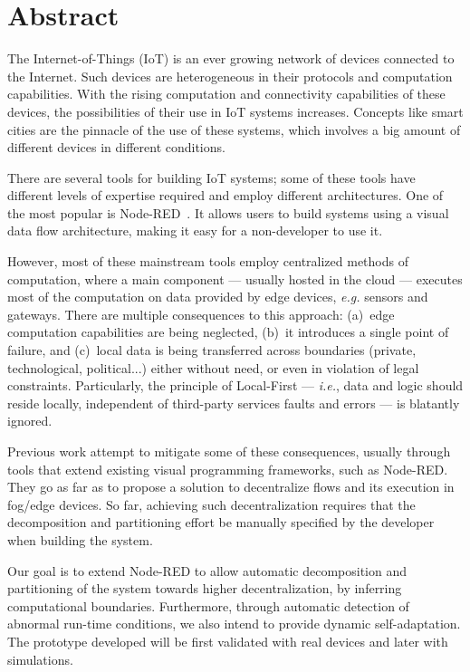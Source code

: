 \chapter*{Abstract}

The Internet-of-Things (IoT) is an ever growing network of devices connected to the Internet. Such devices are heterogeneous in their protocols and computation capabilities. With the rising computation and connectivity capabilities of these devices, the possibilities of their use in IoT systems increases. Concepts like smart cities are the pinnacle of the use of these systems, which involves a big amount of different devices in different conditions.

There are several tools for building IoT systems; some of these tools have different levels of expertise required and employ different architectures. One of the most popular is Node-RED~\cite{Node-red2017}. It allows users to build systems using a visual data flow architecture, making it easy for a non-developer to use it.

However, most of these mainstream tools employ centralized methods of computation, where a main component --- usually hosted in the cloud --- executes most of the computation on data provided by edge devices, \emph{e.g.} sensors and gateways. There are multiple consequences to this approach: (a)~edge computation capabilities are being neglected, (b)~it introduces a single point of failure, and (c)~local data is being transferred across boundaries (private, technological, political...) either without need, or even in violation of legal constraints. Particularly, the principle of Local-First --- \emph{i.e.}, data and logic should reside locally, independent of third-party services faults and errors --- is blatantly ignored.

Previous work attempt to mitigate some of these consequences, usually through tools that extend existing visual programming frameworks, such as Node-RED. They go as far as to propose a solution to decentralize flows and its execution in fog/edge devices. So far, achieving such decentralization requires that the decomposition and partitioning effort be manually specified by the developer when building the system.

Our goal is to extend Node-RED to allow automatic decomposition and partitioning of the system towards higher decentralization, by inferring computational boundaries. Furthermore, through automatic detection of abnormal run-time conditions, we also intend to provide dynamic self-adaptation. The prototype developed will be first validated with real devices and later with simulations.

